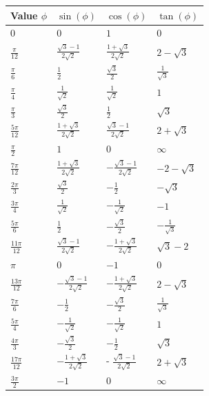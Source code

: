 \documentclass[25pt]{sciposter}
\begin{document}
\begin{multicols}{3}
\begin{center}
	\begin{tabular}{ p{5cm} | p{5cm}  | p{5cm} | p{5cm}  }
		Value $\phi$ & $\sin(\phi)$ & $\cos(\phi)$ & $\tan(\phi)$ \\[0.75ex] \hline \hline 
		$0$ & $0$ & $1$ & $0$ \\  \hline
		$\frac{\pi}{12}$ & $\frac{\sqrt{3} -1}{2\sqrt{2}}$ & $\frac{1 + \sqrt{3}}{2\sqrt{2}}$ & $2 - \sqrt{3}$ \\ \hline
		$\frac{\pi}{6}$ & $\frac{1}{2}$ & $\frac{\sqrt{3}}{2}$ & $\frac{1}{\sqrt{3}}$	\\  \hline
		$\frac{\pi}{4}$ & $\frac{1}{\sqrt{2}}$ & $\frac{1}{\sqrt{2}}$ & $1$ \\  \hline
		$\frac{\pi}{3}$ & $\frac{\sqrt{3}}{2}$ & $\frac{1}{2}$ & $\sqrt{3}$\\  \hline
		$\frac{5\pi}{12}$ & $\frac{1 + \sqrt{3}}{2\sqrt{2}}$ & $\frac{\sqrt{3} - 1}{2\sqrt{2}}$ & $2 + \sqrt{3}$\\  \hline
		$\frac{\pi}{2}$ & $1$ & $0$ & $\infty$\\\hline
		$\frac{7\pi}{12}$ & $\frac{1+\sqrt{3}}{2\sqrt{2}}$ & $ -\frac{\sqrt{3}-1}{2\sqrt{2}}$ & $-2-\sqrt{3}$\\  \hline
		$\frac{2\pi}{3}$ & $\frac{\sqrt{3}}{2}$ & $- \frac{1}{2}$ & $-\sqrt{3}$\\ \hline
		$\frac{3\pi}{4}$ & $\frac{1}{\sqrt{2}}$ & $-\frac{1}{\sqrt{2}}$ & $-1$\\  \hline
		$\frac{5\pi}{6}$ & $\frac{1}{2}$ & $- \frac{\sqrt{3}}{2}$ & $- \frac{1}{\sqrt{3}}$ \\ \hline
		$\frac{11\pi}{12}$ & $\frac{\sqrt{3} -1}{2\sqrt{2}}$ & $-\frac{1+\sqrt{3}}{2\sqrt{2}}$ & $\sqrt{3} -2$\\ \hline
		$\pi$ & $0$ & $-1$ & $0$ \\ \hline
		$\frac{13\pi}{12}$ & $-\frac{\sqrt{3} -1}{2\sqrt{2}}$ & $- \frac{1 + \sqrt{3}}{2\sqrt{2}}$ & $2 - \sqrt{3}$\\ \hline
		$\frac{7\pi}{6}$ & $-\frac{1}{2}$ & $-\frac{\sqrt{3}}{2}$ & $\frac{1}{\sqrt{3}}$\\ \hline
		$\frac{5\pi}{4}$ & $-\frac{1}{\sqrt{2}}$ & $-\frac{1}{\sqrt{2}}$ & $1$ \\ \hline
		$\frac{4 \pi}{3}$ & $- \frac{\sqrt{3}}{2}$ & $-\frac{1}{2}$ & $\sqrt{3}$\\  \hline
		$\frac{17\pi}{12}$ & $-\frac{1+\sqrt{3}}{2\sqrt{2}}$ & - $\frac{\sqrt{3}-1}{2\sqrt{2}}$ & $2+ \sqrt{3}$\\ \hline
		$\frac{3\pi}{2}$ & $-1$ & $0$ & $\infty$ \\ \hline

\end{tabular}
\end{center}
\end{multicols}
\end{document}

